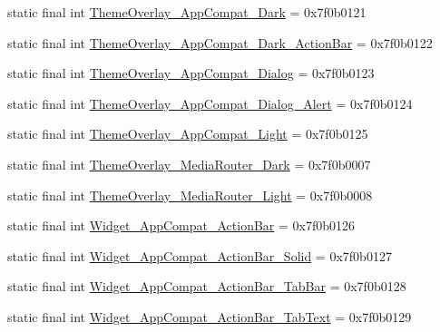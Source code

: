 \begin{CompactItemize}
static final int \hyperlink{classandroid_1_1support_1_1graphics_1_1drawable_1_1animated_1_1_r_1_1style_ff537f4f29b7dc3dd6c4fcf3c8a5ebc8}{ThemeOverlay\_\-AppCompat\_\-Dark} = 0x7f0b0121
\item 
static final int \hyperlink{classandroid_1_1support_1_1graphics_1_1drawable_1_1animated_1_1_r_1_1style_beb2176d419831261f283390898b8ee2}{ThemeOverlay\_\-AppCompat\_\-Dark\_\-ActionBar} = 0x7f0b0122
\item 
static final int \hyperlink{classandroid_1_1support_1_1graphics_1_1drawable_1_1animated_1_1_r_1_1style_001c1ed25bccb646e43f590fe1f1cf7f}{ThemeOverlay\_\-AppCompat\_\-Dialog} = 0x7f0b0123
\item 
static final int \hyperlink{classandroid_1_1support_1_1graphics_1_1drawable_1_1animated_1_1_r_1_1style_27dd23739034f6adb53e9f2e3c511f39}{ThemeOverlay\_\-AppCompat\_\-Dialog\_\-Alert} = 0x7f0b0124
\item 
static final int \hyperlink{classandroid_1_1support_1_1graphics_1_1drawable_1_1animated_1_1_r_1_1style_2cc389c386e8fd46eb79cde057b9640d}{ThemeOverlay\_\-AppCompat\_\-Light} = 0x7f0b0125
\item 
static final int \hyperlink{classandroid_1_1support_1_1graphics_1_1drawable_1_1animated_1_1_r_1_1style_dfe409eecddeb0c6a70eaa5584ef4112}{ThemeOverlay\_\-MediaRouter\_\-Dark} = 0x7f0b0007
\item 
static final int \hyperlink{classandroid_1_1support_1_1graphics_1_1drawable_1_1animated_1_1_r_1_1style_4200e32c0f17b8e6f4e7e5db5700a855}{ThemeOverlay\_\-MediaRouter\_\-Light} = 0x7f0b0008
\item 
static final int \hyperlink{classandroid_1_1support_1_1graphics_1_1drawable_1_1animated_1_1_r_1_1style_ac5cd09c5dabe96e60a9f09fcd5a3e34}{Widget\_\-AppCompat\_\-ActionBar} = 0x7f0b0126
\item 
static final int \hyperlink{classandroid_1_1support_1_1graphics_1_1drawable_1_1animated_1_1_r_1_1style_5d712082900a67e0208b474d11e0d518}{Widget\_\-AppCompat\_\-ActionBar\_\-Solid} = 0x7f0b0127
\item 
static final int \hyperlink{classandroid_1_1support_1_1graphics_1_1drawable_1_1animated_1_1_r_1_1style_799cb7a71565d22c53e9f801d5cdd9a5}{Widget\_\-AppCompat\_\-ActionBar\_\-TabBar} = 0x7f0b0128
\item 
static final int \hyperlink{classandroid_1_1support_1_1graphics_1_1drawable_1_1animated_1_1_r_1_1style_3defa184c07b78d4ba0bee4ee3737640}{Widget\_\-AppCompat\_\-ActionBar\_\-TabText} = 0x7f0b0129
\item 

\end{CompactItemize}
